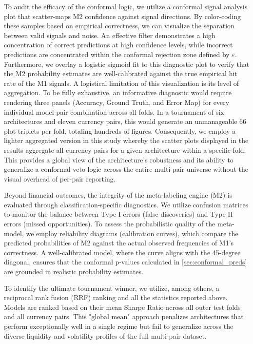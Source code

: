 \documentclass[12pt, a4paper]{article}
\begin{document}
\medskip

To audit the efficacy of the conformal logic, we utilize a conformal signal analysis plot that scatter-maps M2 confidence against signal directions. 
By color-coding these samples based on empirical correctness, we can visualize the separation between valid signals and noise. 
An effective filter demonstrates a high concentration of correct predictions at high confidence levels, while incorrect predictions are concentrated within the conformal rejection
zone defined by $\varepsilon$. Furthermore, we overlay a logistic sigmoid fit to this diagnostic plot to verify that the M2 probability estimates are well-calibrated 
against the true empirical hit rate of the M1 signals.
A logistical limitation of this visualization is its level of aggregation. To be fully exhaustive, an informative diagnostic would require rendering three panels 
(Accuracy, Ground Truth, and Error Map) for every individual model-pair combination across all folds. In a tournament of six architectures and eleven currency pairs, this would
generate an unmanageable 66 plot-triplets per fold, totaling hundreds of figures. Consequently, we employ a lighter aggregated version in this study whereby the scatter plots displayed in 
the results aggregate all currency pairs for a given architecture within a specific fold. This provides a global view of the architecture's robustness and its ability to
generalize a conformal veto logic across the entire multi-pair universe without the visual overhead of per-pair reporting.

\medskip

Beyond financial outcomes, the integrity of the meta-labeling engine (M2) is evaluated through classification-specific diagnostics. We utilize confusion matrices to monitor the balance 
between Type I errors (false discoveries) and Type II errors (missed opportunities). To assess the probabilistic quality of the meta-model, we employ reliability diagrams (calibration curves), 
which compare the predicted probabilities of M2 against the actual observed frequencies of M1's correctness. A well-calibrated model, where the curve aligns with the 45-degree diagonal, 
ensures that the conformal p-values calculated in \ref{sec:conformal_preds} are grounded in realistic probability estimates.

\medskip

To identify the ultimate tournament winner, we utilize, among others, a reciprocal rank fusion (RRF) ranking and all the statistics reported above. Models are ranked based on their mean Sharpe Ratio across all 
outer test folds and all currency pairs. This "global mean" approach penalizes architectures that perform exceptionally well in a single regime but fail to generalize across the 
diverse liquidity and volatility profiles of the full multi-pair dataset.
\end{document}
